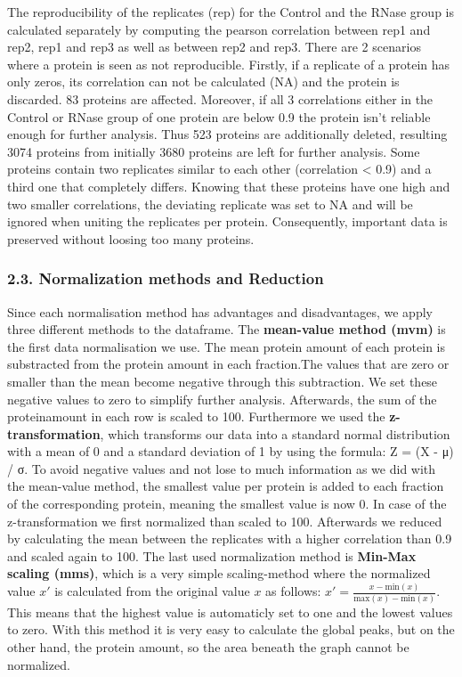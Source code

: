 \documentclass[
  12pt,
]{article}
\begin{document}
The reproducibility of the replicates (rep) for the Control and the
RNase group is calculated separately by computing the pearson
correlation between rep1 and rep2, rep1 and rep3 as well as between rep2
and rep3. There are 2 scenarios where a protein is seen as not
reproducible. Firstly, if a replicate of a protein has only zeros, its
correlation can not be calculated (NA) and the protein is discarded. 83
proteins are affected. Moreover, if all 3 correlations either in the
Control or RNase group of one protein are below 0.9 the protein isn't
reliable enough for further analysis. Thus 523 proteins are additionally
deleted, resulting 3074 proteins from initially 3680 proteins are left
for further analysis. Some proteins contain two replicates similar to
each other (correlation \textless{} 0.9) and a third one that completely
differs. Knowing that these proteins have one high and two smaller
correlations, the deviating replicate was set to NA and will be ignored
when uniting the replicates per protein. Consequently, important data is
preserved without loosing too many proteins.

\hypertarget{normalization-methods-and-reduction}{%
\subsubsection{2.3. Normalization methods and
Reduction}\label{normalization-methods-and-reduction}}

Since each normalisation method has advantages and disadvantages, we
apply three different methods to the dataframe. The \textbf{mean-value
method (mvm)} is the first data normalisation we use. The mean protein
amount of each protein is substracted from the protein amount in each
fraction.The values that are zero or smaller than the mean become
negative through this subtraction. We set these negative values to zero
to simplify further analysis. Afterwards, the sum of the proteinamount
in each row is scaled to 100. Furthermore we used the
\textbf{z-transformation}, which transforms our data into a standard
normal distribution with a mean of 0 and a standard deviation of 1 by
using the formula: Z = (X - μ) / σ. To avoid negative values and not
lose to much information as we did with the mean-value method, the
smallest value per protein is added to each fraction of the
corresponding protein, meaning the smallest value is now 0. In case of
the z-transformation we first normalized than scaled to 100. Afterwards
we reduced by calculating the mean between the replicates with a higher
correlation than 0.9 and scaled again to 100. The last used
normalization method is \textbf{Min-Max scaling (mms)}, which is a very
simple scaling-method where the normalized value \(x'\) is calculated
from the original value \(x\) as follows:
\(x'=\frac{{x-\text{min}(x)}}{{\text{max}(x)-\text{min}(x)}}\). This
means that the highest value is automaticly set to one and the lowest
values to zero. With this method it is very easy to calculate the global
peaks, but on the other hand, the protein amount, so the area beneath
the graph cannot be normalized.
\end{document}
